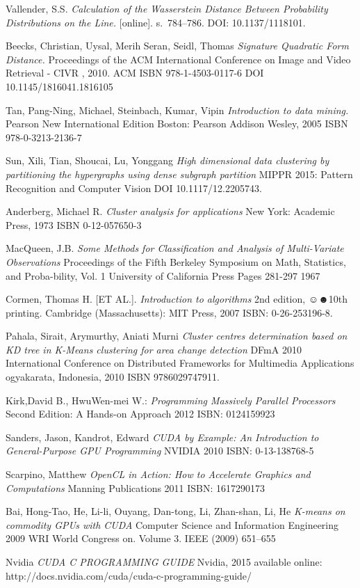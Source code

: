\begin{thebibliography}{99}
{\sc Vallender,} S.S.
\emph{Calculation of the Wasserstein Distance Between Probability Distributions on the Line.}
[online]. s.~784--786. DOI: 10.1137/1118101.

{\sc Beecks,} Christian, {\sc Uysal,} Merih Seran, {\sc Seidl,} Thomas
\emph{Signature Quadratic Form Distance.}
Proceedings of the ACM International Conference on Image and Video Retrieval - CIVR , 2010.
ACM
ISBN 978-1-4503-0117-6
DOI 10.1145/1816041.1816105

{\sc Tan,} Pang-Ning, {\sc Michael,} Steinbach, {\sc Kumar,} Vipin
\emph{Introduction to data mining.}
Pearson New International Edition
Boston: Pearson Addison Wesley, 2005
ISBN 978-0-3213-2136-7

{\sc Sun,} Xili, {\sc Tian,} Shoucai, {\sc Lu,} Yonggang
\emph{High dimensional data clustering by partitioning the hypergraphs using dense subgraph partition}
MIPPR 2015: Pattern Recognition and Computer Vision
DOI 10.1117/12.2205743.

{\sc Anderberg,} Michael R.
\emph{Cluster analysis for applications}
New York: Academic Press, 1973
ISBN 0-12-057650-3


{\sc MacQueen}, J.B.
\emph{Some Methods for Classification and Analysis of Multi-Variate Observations}
Proceedings of the Fifth Berkeley Symposium on Math, Statistics, and Proba-bility, Vol. 1
University of California Press
Pages 281-297
1967

{\sc Cormen,} Thomas H. [ET AL.].
\emph{Introduction to algorithms}
2nd edition, ☺☻10th printing.
Cambridge (Massachusetts): MIT Press, 2007 
ISBN: 0-26-253196-8.

{\sc Pahala,} Sirait, {\sc Arymurthy,} Aniati Murni
\emph{Cluster centres determination based on KD tree in K-Means clustering for area change detection}
DFmA 2010 International Conference on Distributed Frameworks for Multimedia Applications
ogyakarata, Indonesia, 2010 
ISBN 9786029747911.

{\sc Kirk,}David B., {\sc Hwu}Wen-mei W.:
\emph{Programming Massively Parallel Processors}
Second Edition: A Hands-on Approach
2012
ISBN: 0124159923 

{\sc Sanders,} Jason, {\sc Kandrot,} Edward
\emph{CUDA by Example: An Introduction to General-Purpose GPU Programming}
NVIDIA
2010
ISBN: 0-13-138768-5 

{\sc Scarpino,} Matthew
\emph{OpenCL in Action: How to Accelerate Graphics and Computations}
Manning Publications
2011
ISBN: 1617290173 

{\sc Bai,} Hong-Tao, {\sc He,} Li-li, {\sc Ouyang,} Dan-tong, {\sc Li,} Zhan-shan, {\sc Li, } He
\emph{K-means on commodity GPUs with CUDA}
 Computer Science and Information Engineering
 2009
 WRI World Congress on. Volume 3.
 IEEE (2009) 651–655 

Nvidia
\emph{CUDA C PROGRAMMING GUIDE}
Nvidia, 2015
available online: http://docs.nvidia.com/cuda/cuda-c-programming-guide/
\end{thebibliography}